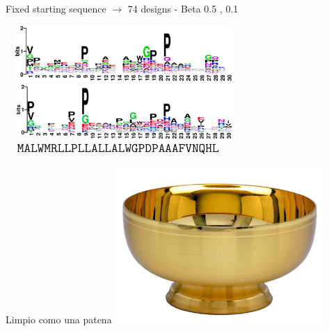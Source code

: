 \documentclass{beamer}
\begin{document}
\begin{frame}
\centering
Fixed starting sequence $\rightarrow$ 74 designs - Beta 0.5 , 0.1\\

\begin{adjustwidth}{-1.5em}{-2.5em}
\includegraphics[width=340px,height=80px]{../img/logo.png}\\ 
\includegraphics[width=345px,height=80px]{../img/logoBeta0-1.png}\\ 
\vspace{5px}
\hspace{18px}\includegraphics[width=324px,height=15px]{../img/sequence.png}
\end{adjustwidth}
\end{frame}











\begin{frame}{Limpio como una patena}
\centering
\includegraphics[width=300px]{../img/patena.jpg}
\end{frame}
\end{document}
